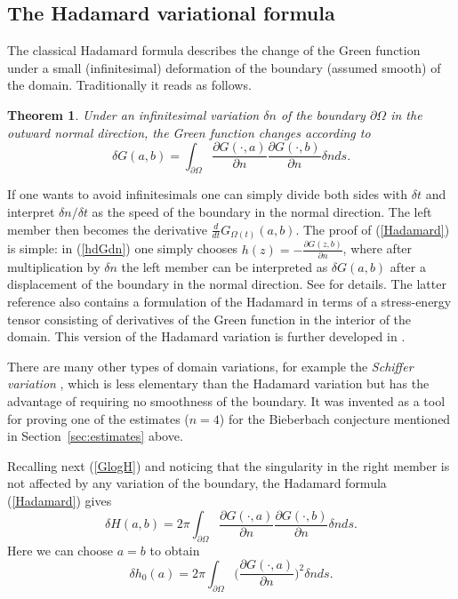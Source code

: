 \documentclass[reqno,12pt]{article}
\theoremstyle{plain}
\newtheorem{theorem}{Theorem}[section]
\theoremstyle{definition}
\numberwithin{equation}{section}
\numberwithin{figure}{section}
\begin{document}

\subsection{The Hadamard variational formula}\label{sec:Hadamard}

The classical Hadamard formula describes the change of the Green function under a small
(infinitesimal) deformation of the boundary (assumed smooth) of the domain.
Traditionally it  reads as follows.

\begin{theorem}
Under an infinitesimal variation $\delta n$ of the boundary $\partial \Omega$ in the outward normal 
direction, the Green function changes according to
\begin{equation}\label{Hadamard}
\delta G(a,b)=\int_{\partial \Omega}\frac{\partial G(\cdot,a)}{\partial n}\frac{\partial G(\cdot,b)}{\partial n}\delta n ds.
\end{equation}
\end{theorem}
If one wants to avoid infinitesimals one can simply divide both sides with $\delta t$ and interpret $\delta n/\delta t$
as the speed of the boundary in the normal direction. The left member then becomes the derivative
$\frac{d}{dt}G_{\Omega(t)}(a,b)$. 
The proof of (\ref{Hadamard}) is simple: in (\ref{hdGdn})
one simply chooses $h(z)=-\frac{\partial G(z,b)}{\partial n}$, where after multiplication by $\delta n$
the left member can be interpreted as  $\delta G(a,b)$ after a displacement 
of the boundary in the normal direction. See  \cite{Nehari-1952, Garabedian-1964} for details.
The latter reference also contains a formulation of the Hadamard in terms of a stress-energy
tensor consisting of derivatives of the Green function in the interior of the domain. This version of the 
Hadamard variation is further developed in \cite{Gustafsson-Sebbar-2022}.   

There are many other types of domain variations, for example the {\it Schiffer variation} 
\cite{Ahlfors-1973, Duren-1983, Wolpert-2018},
which is less elementary than the Hadamard variation but has the advantage of
requiring no smoothness of the boundary.
It was invented as a tool for proving one of the estimates 
($n=4$) for the Bieberbach conjecture mentioned in Section~\ref{sec:estimates} above.

Recalling next (\ref{GlogH}) and noticing that the singularity in the right member is not affected by any variation of  
the boundary, the Hadamard formula (\ref{Hadamard}) gives
\begin{equation}\label{HadamardH}
\delta H(a,b)=2\pi \int_{\partial \Omega}\frac{\partial G(\cdot,a)}{\partial n}\frac{\partial G(\cdot,b)}{\partial n}\delta n ds.
\end{equation}
Here we can choose $a=b$ to obtain
\begin{equation}\label{Hadamardh}
\delta h_0(a)=2\pi \int_{\partial \Omega}\Big(\frac{\partial G(\cdot,a)}{\partial n}\Big)^2\delta n ds.
\end{equation}
\end{document}
